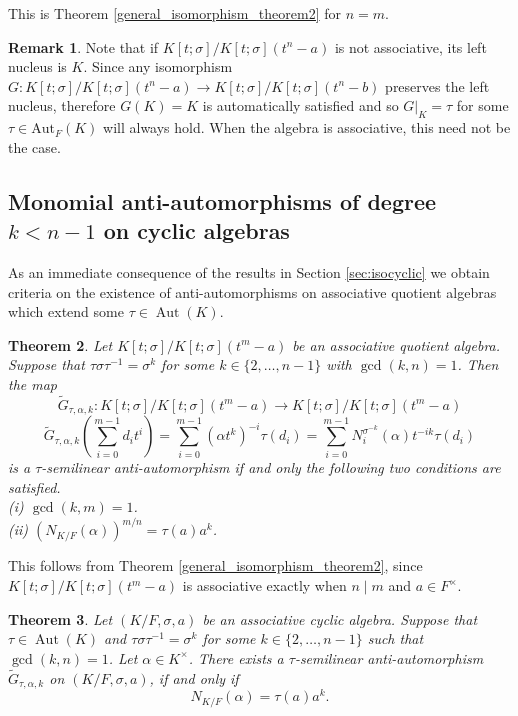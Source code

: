 \documentclass{amsart}
\theoremstyle{plain}
\newtheorem{theorem}{Theorem}[section]
\theoremstyle{definition}
\newtheorem{remark}[theorem]{Remark}
\numberwithin{equation}{section}
\numberwithin{figure}{section}
\DeclareMathOperator{\Aut}{Aut}
\begin{document}
 This is Theorem \ref{general_isomorphism_theorem2} for $n=m$.


 \begin{remark}
 Note that if $K[t;\sigma]/K[t;\sigma](t^n-a)$ is not
associative, its left nucleus is $K$. Since any isomorphism  $G:K[t;\sigma]/K[t;\sigma](t^n-a)\to K[t;\sigma]/K[t;\sigma](t^n-b)$ preserves the left nucleus, therefore $G(K) = K$ is automatically satisfied  and so $G \vert_K = \tau$ for some
 $\tau \in \text{Aut}_F(K)$ will always hold. When the algebra is associative, this need not be the case.
\end{remark}



\subsection{Monomial anti-automorphisms  of degree $k<n-1$ on cyclic algebras}

As an immediate consequence of the results in Section \ref{sec:isocyclic} we obtain  criteria on the existence of anti-automorphisms on associative quotient algebras which extend some $\tau\in \Aut(K)$.

\begin{theorem}  \label{general_antiautomorphism_theorem2}
Let $K[t;\sigma]/K[t;\sigma](t^m-a)$ be an associative quotient algebra. Suppose that $\tau \sigma\tau^{-1}=\sigma^k$ for some $k\in \{2,\dots, n-1 \}$ with $\gcd (k, n)=1$. Then the map
 $$
  \widetilde G_{\tau,\alpha,k}:K[t;\sigma]/K[t;\sigma](t^m-a)\to K[t;\sigma]/K[t;\sigma](t^m-a)
  $$
  $$
 \widetilde G_{\tau,\alpha,k} ( \sum_{i=0}^{m-1}d_it^i ) = \sum_{i=0}^{m-1} (\alpha t^k)^{-i} \tau(d_i) = \sum_{i=0}^{m-1}
  N_i^{\sigma^{-k}}(\alpha) t^{-ik} \tau(d_i)
$$
is a $\tau$-semilinear anti-automorphism if and only  the following two conditions are satisfied.
\\ (i)  $\gcd(k,m)=1$.
\\ (ii)
$(N_{K/F}(\alpha))^{m/n} =\tau(a)a^k$.
\end{theorem}

This follows from Theorem \ref{general_isomorphism_theorem2}, since $K[t;\sigma]/K[t;\sigma](t^m-a)$ is associative exactly when $n\mid m$ and $a\in F^\times$.



\begin{theorem}  \label{general_antiautomorphism_theorem4}
Let  $(K/F,\sigma,a)$ be an associative cyclic algebra. Suppose that  $\tau\in \Aut(K)$ and $\tau \sigma\tau^{-1}=\sigma^k$ for some $k\in \{2,\dots, n-1 \}$ such that $\gcd (k, n)=1$.
 Let $\alpha\in K^\times$.
 There exists a $\tau$-semilinear anti-automorphism
 $\widetilde G_{\tau,\alpha,k}$ on $ (K/F,\sigma,a)$, if and only if
  $$N_{K/F}(\alpha)=\tau(a)a^{k}.$$
\end{theorem}
\end{document}
